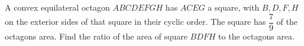 A convex equilateral octagon $ABCDEFGH$ has $ACEG$ a square, with $B,D,F,H$ on the exterior sides of that square in their cyclic order. The square has $\dfrac{7}{9}$ of the octagon\textquotesingle s area. Find the ratio of the area of square $BDFH$ to the octagon\textquotesingle s area.
